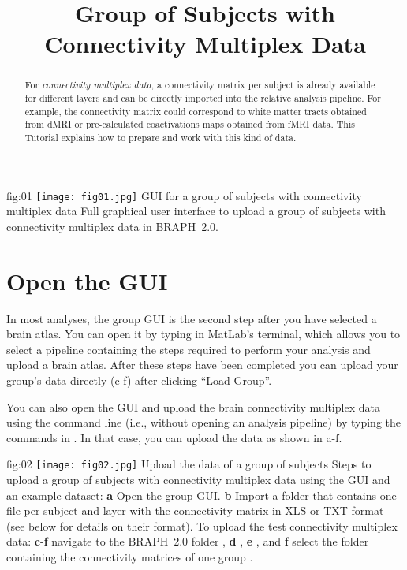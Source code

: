 \documentclass[justified]{tufte-handout}
\title{Group of Subjects with Connectivity Multiplex Data}
\begin{document}
\maketitle

\begin{abstract}
\noindent
For \emph{connectivity multiplex data}, a connectivity matrix per subject is already available for different layers and can be directly imported into the relative analysis pipeline. For example, the connectivity matrix could correspond to white matter tracts obtained from dMRI or pre-calculated coactivations maps obtained from fMRI data.
This Tutorial explains how to prepare and work with this kind of data.
\end{abstract}

\tableofcontents

	{fig:01}
	{\texttt{[image: fig01.jpg]}}
	{GUI for a group of subjects with connectivity multiplex data}
	{
	Full graphical user interface to upload a group of subjects with connectivity multiplex data in BRAPH~2.0. 
	}

\clearpage
\section{Open the GUI}

In most analyses, the group GUI is the second step after you have selected a brain atlas. You can open it by typing  in MatLab's terminal, which allows you to select a pipeline containing the steps required to perform your analysis and upload a brain atlas. After these steps have been completed you can upload your group's data directly (c-f) after clicking ``Load Group''.

You can also open the GUI and upload the brain connectivity multiplex data using the command line (i.e., without opening an analysis pipeline) by typing the commands in . In that case, you can upload the data as shown in a-f.

	{fig:02}
	{
	\texttt{[image: fig02.jpg]}
	}
	{Upload the data of a group of subjects}
	{
	Steps to upload a group of subjects with connectivity multiplex data using the GUI and an example dataset: 
	{\bf a} Open the group GUI.
	{\bf b} Import a folder that contains one file per subject and layer with the connectivity matrix in XLS or TXT format (see below for details on their format).
	To upload the test connectivity multiplex data:
	{\bf c}-{\bf f} navigate to the BRAPH~2.0 folder , {\bf d} ,  {\bf e} , and {\bf f} select the folder containing the connectivity matrices of one group .
	}
\end{document}

